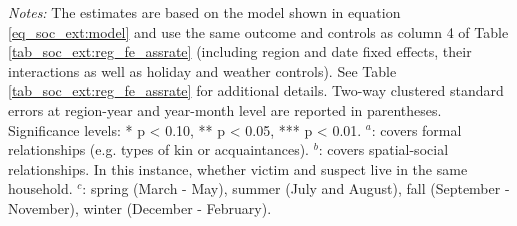 \begin{table}[ht]
\begin{threeparttable}
{\begin{tabular}{l*{6}{c}}
				
				\bottomrule 
		\end{tabular}}
		\begin{tablenotes} 
			\item \scriptsize \emph{Notes:} The estimates are based on the model shown in equation \ref{eq_soc_ext:model} and use the same outcome and controls as column 4 of Table \ref{tab_soc_ext:reg_fe_assrate} (including region and date fixed effects, their interactions as well as holiday and weather controls). See Table \ref{tab_soc_ext:reg_fe_assrate} for additional details. Two-way clustered standard errors at region-year and year-month level are reported in parentheses. \newline Significance levels: * p < 0.10, ** p < 0.05, *** p < 0.01.\newline \hspace*{15pt} $^a$: covers formal relationships (e.g. types of kin or acquaintances). \newline \hspace*{15pt} $^b$: covers spatial-social relationships. In this instance, whether victim and suspect live in the same household.\newline \hspace*{15pt} $^c$: spring (March - May), summer (July and August), fall (September - November), winter (December - February).
		\end{tablenotes} 
	\end{threeparttable} 
\end{table}




